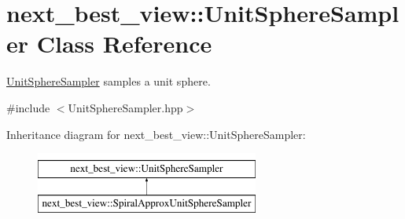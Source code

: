 \hypertarget{classnext__best__view_1_1UnitSphereSampler}{\section{next\-\_\-best\-\_\-view\-:\-:\-Unit\-Sphere\-Sampler \-Class \-Reference}
\label{classnext__best__view_1_1UnitSphereSampler}
}


\hyperlink{classnext__best__view_1_1UnitSphereSampler}{\-Unit\-Sphere\-Sampler} samples a unit sphere.  




{\ttfamily \#include $<$\-Unit\-Sphere\-Sampler.\-hpp$>$}

\-Inheritance diagram for next\-\_\-best\-\_\-view\-:\-:\-Unit\-Sphere\-Sampler\-:\begin{figure}[H]
\begin{center}
\leavevmode
\includegraphics[height=2.000000cm]{classnext__best__view_1_1UnitSphereSampler}
\end{center}
\end{figure}
